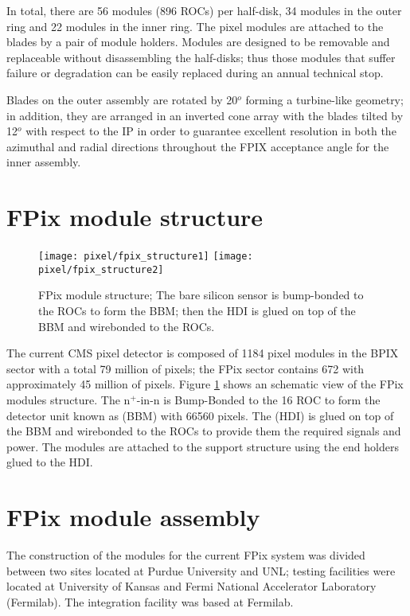 In total, there are 56 modules (896 ROCs) per half-disk, 34 modules in the outer ring and 22 modules in the inner ring. The pixel modules are attached to the blades by a pair of module holders. Modules are designed to be removable and replaceable without disassembling the half-disks; thus those modules that suffer failure or degradation can be easily replaced during an annual technical stop.

Blades on the outer assembly are rotated by 20$^o$ forming a turbine-like geometry; in addition, they are arranged in an inverted cone array with the blades tilted by 12$^o$ with respect to the IP in order to guarantee excellent resolution in both the azimuthal and radial directions throughout the FPIX acceptance angle for the inner assembly.

\section{FPix module structure}

\begin{figure}[!h]
  \centering
  \texttt{[image: pixel/fpix\_structure1]}
  \texttt{[image: pixel/fpix\_structure2]}
  \caption[FPix module structure.]{FPix module structure; The bare silicon sensor is bump-bonded to the ROCs to form the BBM; then the HDI is glued on top of the BBM and wirebonded to the ROCs.}\label{fig:fpix_struc}
\end{figure}

The current CMS pixel detector is composed of 1184 pixel modules in the BPIX sector with a total 79 million of pixels; the FPix sector contains 672 with approximately 45 million of pixels. Figure \ref{fig:fpix_struc} shows an schematic view of the FPix modules structure. The n$^{+}$-in-n  is Bump-Bonded to the 16 ROC to form the detector unit known as  (BBM) with 66560 pixels. The  (HDI) is glued on top of the BBM and wirebonded to the ROCs to provide them the required signals and power. The modules are attached to the support structure using the end holders glued to the HDI.

\section{FPix module assembly}

The construction of the modules for the current FPix system was divided between two sites located at Purdue University and UNL; testing facilities were located at University of Kansas and Fermi National Accelerator Laboratory (Fermilab). The integration facility was based at Fermilab. 

